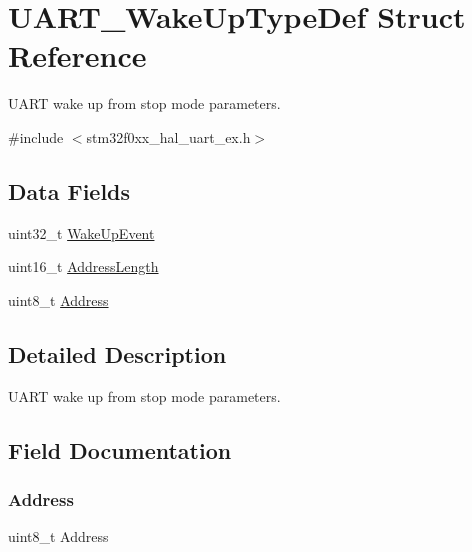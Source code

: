 \hypertarget{struct_u_a_r_t___wake_up_type_def}{}\section{U\+A\+R\+T\+\_\+\+Wake\+Up\+Type\+Def Struct Reference}
\label{struct_u_a_r_t___wake_up_type_def}


U\+A\+RT wake up from stop mode parameters.  




{\ttfamily \#include $<$stm32f0xx\+\_\+hal\+\_\+uart\+\_\+ex.\+h$>$}

\subsection*{Data Fields}
\begin{DoxyCompactItemize}
\item 
uint32\+\_\+t \hyperlink{struct_u_a_r_t___wake_up_type_def_a1146a984a15b77174e96057cb88e4f59}{Wake\+Up\+Event}
\item 
uint16\+\_\+t \hyperlink{struct_u_a_r_t___wake_up_type_def_a5be92432486df9b5320d668c236e1b6f}{Address\+Length}
\item 
uint8\+\_\+t \hyperlink{struct_u_a_r_t___wake_up_type_def_ae2bbeaf207df18992544fd4193b34112}{Address}
\end{DoxyCompactItemize}


\subsection{Detailed Description}
U\+A\+RT wake up from stop mode parameters. 

\subsection{Field Documentation}
\mbox{\label{struct_u_a_r_t___wake_up_type_def_ae2bbeaf207df18992544fd4193b34112}} 
\subsubsection{\texorpdfstring{Address}{Address}}
{\footnotesize\ttfamily uint8\+\_\+t Address}

